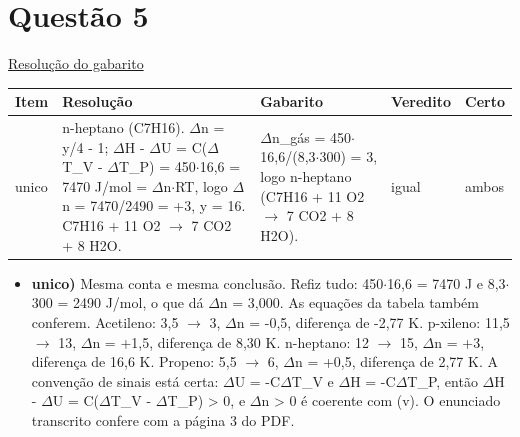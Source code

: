 \documentclass{article}%
\begin{document}
\section*{Questão 5}%
\href{https://poliedroresolve.sistemapoliedro.com.br/vestibulares/ime/2027/ime-2-fase-dia-3-28-10-2026-2-fase-dia-3/dissertativa-5-quimica-2-fase-dia-3-ime-2027}{Resolução do gabarito}\par\smallskip%
\begin{longtable}{@{}p{} p{} p{} p{} p{}@{}}\toprule Item & Resolução & Gabarito & Veredito & Certo \\ \midrule
unico & n{-}heptano (C7H16). $\Delta$n = y/4 - 1; $\Delta$H - $\Delta$U = C($\Delta$T\_V - $\Delta$T\_P) = 450$\cdot$16,6 = 7470 J/mol = $\Delta$n$\cdot$RT, logo $\Delta$n = 7470/2490 = +3, y = 16. C7H16 + 11 O2 $\to$ 7 CO2 + 8 H2O. & $\Delta$n\_gás = 450$\cdot$16,6/(8,3$\cdot$300) = 3, logo n{-}heptano (C7H16 + 11 O2 $\to$ 7 CO2 + 8 H2O). & igual & ambos \\
\bottomrule\end{longtable}%
\begin{itemize}%
\item%
\textbf{unico)} Mesma conta e mesma conclusão. Refiz tudo: 450$\cdot$16,6 = 7470 J e 8,3$\cdot$300 = 2490 J/mol, o que dá $\Delta$n = 3,000. As equações da tabela também conferem. Acetileno: 3,5 $\to$ 3, $\Delta$n = -0,5, diferença de -2,77 K. p{-}xileno: 11,5 $\to$ 13, $\Delta$n = +1,5, diferença de 8,30 K. n{-}heptano: 12 $\to$ 15, $\Delta$n = +3, diferença de 16,6 K. Propeno: 5,5 $\to$ 6, $\Delta$n = +0,5, diferença de 2,77 K. A convenção de sinais está certa: $\Delta$U = -C$\Delta$T\_V e $\Delta$H = -C$\Delta$T\_P, então $\Delta$H - $\Delta$U = C($\Delta$T\_V - $\Delta$T\_P) > 0, e $\Delta$n > 0 é coerente com (v). O enunciado transcrito confere com a página 3 do PDF.%
\end{itemize}%
\end{document}
